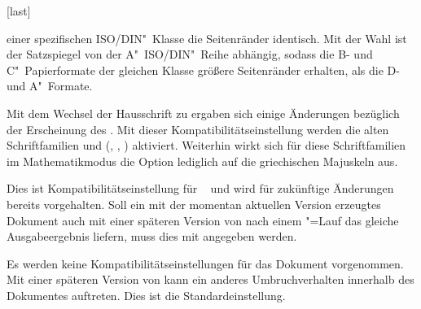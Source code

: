 \begin{Declaration*}{}
\begin{Declaration*}{}
\begin{Declaration*}{}
\begin{Declaration}[v2.03]{}[last]
\begin{values}{}
  einer spezifischen ISO/DIN"~Klasse die Seitenränder identisch. Mit der Wahl 
   ist der Satzspiegel von der A"~ISO/DIN"~Reihe 
  abhängig, sodass die B- und C"~Papierformate der gleichen Klasse größere 
  Seitenränder erhalten, als die D- und A"~Formate.
\item[\PValue{2.05}]
  Mit dem Wechsel der Hausschrift zu \OpenSans ergaben sich einige Änderungen 
  bezüglich der Erscheinung des \CDs. Mit dieser Kompatibilitätseinstellung 
  werden die alten Schriftfamilien \Univers und \DIN 
  (, , )
  aktiviert. Weiterhin wirkt sich für diese Schriftfamilien im Mathematikmodus 
  die Option  lediglich auf die griechischen 
  Majuskeln aus.
\item[\PValue{2.06}]
  Dies ist Kompatibilitätseinstellung für \TUDScript~\vTUDScript{} und wird für 
  zukünftige Änderungen bereits vorgehalten. Soll ein mit der momentan 
  aktuellen Version erzeugtes Dokument auch mit einer späteren Version von 
  \TUDScript nach einem "=Lauf das gleiche Ausgabeergebnis 
  liefern, muss dies mit  angegeben werden.
\item[\PValue{last}]
  Es werden keine Kompatibilitätseinstellungen für das Dokument vorgenommen. 
  Mit einer späteren Version von \TUDScript kann ein anderes Umbruchverhalten 
  innerhalb des Dokumentes auftreten. Dies ist die Standardeinstellung.
\end{values}
\end{Declaration}
\end{Declaration*}
\end{Declaration*}
\end{Declaration*}

